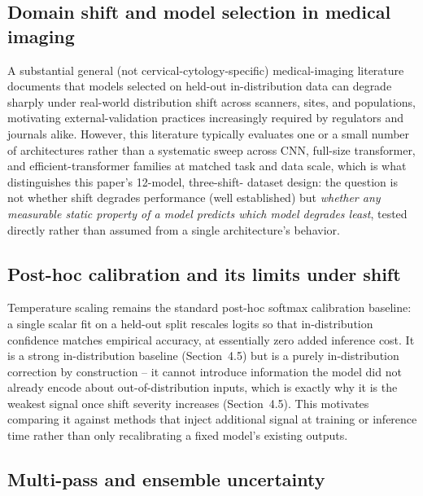 \documentclass[runningheads]{llncs}
\begin{document}
\subsection{Domain shift and model selection in medical imaging}

A substantial general (not cervical-cytology-specific) medical-imaging
literature documents that models selected on held-out in-distribution
data can degrade sharply under real-world distribution shift across
scanners, sites, and populations, motivating external-validation
practices increasingly required by regulators and journals alike.
However, this literature typically evaluates one or a small number of
architectures rather than a systematic sweep across CNN, full-size
transformer, and efficient-transformer families at matched task and data
scale, which is what distinguishes this paper's 12-model, three-shift-
dataset design: the question is not whether shift degrades performance
(well established) but \emph{whether any measurable static property of a
model predicts which model degrades least}, tested directly rather than
assumed from a single architecture's behavior.

\subsection{Post-hoc calibration and its limits under shift}

Temperature scaling \cite{guo2017calibration} remains the standard
post-hoc softmax calibration baseline: a single scalar fit on a held-out
split rescales logits so that in-distribution confidence matches
empirical accuracy, at essentially zero added inference cost. It is a
strong in-distribution baseline (Section~4.5) but is a purely
in-distribution correction by construction -- it cannot introduce
information the model did not already encode about out-of-distribution
inputs, which is exactly why it is the weakest signal once shift severity
increases (Section~4.5). This motivates comparing it against methods that
inject additional signal at training or inference time rather than only
recalibrating a fixed model's existing outputs.

\subsection{Multi-pass and ensemble uncertainty}
\end{document}
